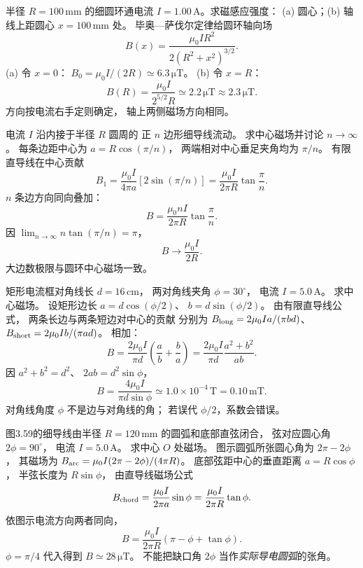 半径 $R=100\,\mathrm{mm}$ 的细圆环通电流
$I=1.00\,\mathrm A$。求磁感应强度：
(a) 圆心；(b) 轴线上距圆心
$x=100\,\mathrm{mm}$ 处。
\exsolution
毕奥—萨伐尔定律给圆环轴向场
\[
B(x)=\frac{\mu_0IR^2}{2(R^2+x^2)^{3/2}}.
\]
(a) 令 $x=0$：
$\boxed{B_0=\mu_0I/(2R)\simeq6.3\,\mathrm{\mu T}}$。
(b) 令 $x=R$：
\[
\boxed{B(R)=\frac{\mu_0I}{2^{5/2}R}
\simeq2.2\,\mathrm{\mu T}\approx2.3\,\mathrm{\mu T}}.
\]
\excheck 方向按电流右手定则确定，
轴上两侧磁场方向相同。

电流 $I$ 沿内接于半径 $R$ 圆周的
正 $n$ 边形细导线流动。
求中心磁场并讨论 $n\to\infty$。
\exsolution
每条边距中心为
$a=R\cos(\pi/n)$，
两端相对中心垂足夹角均为 $\pi/n$。
有限直导线在中心贡献
\[
B_1=\frac{\mu_0I}{4\pi a}
[2\sin(\pi/n)]
=\frac{\mu_0I}{2\pi R}\tan\frac\pi n.
\]
$n$ 条边方向同向叠加：
\[
\boxed{B=\frac{\mu_0 nI}{2\pi R}\tan\frac\pi n}.
\]
因 $\lim_{n\to\infty}n\tan(\pi/n)=\pi$，
\[
\boxed{B\longrightarrow\frac{\mu_0I}{2R}}.
\]
\excheck 大边数极限与圆环中心磁场一致。

矩形电流框对角线长
$d=16\,\mathrm{cm}$，
两对角线夹角 $\phi=30^\circ$，
电流 $I=5.0\,\mathrm A$。
求中心磁场。
\exsolution
设矩形边长
$a=d\cos(\phi/2)$、
$b=d\sin(\phi/2)$。
由有限直导线公式，
两条长边与两条短边对中心的贡献
分别为
$B_{\rm long}=2\mu_0I a/(\pi bd)$、
$B_{\rm short}=2\mu_0I b/(\pi ad)$。
相加：
\[
B=\frac{2\mu_0I}{\pi d}
\left(\frac ab+\frac ba\right)
=\frac{2\mu_0I}{\pi d}
\frac{a^2+b^2}{ab}.
\]
因 $a^2+b^2=d^2$、
$2ab=d^2\sin\phi$，
\[
\boxed{B=\frac{4\mu_0I}{\pi d\sin\phi}
\simeq1.0\times10^{-4}\,\mathrm T=0.10\,\mathrm{mT}}.
\]
\excheck 对角线角度 $\phi$ 不是边与对角线的角；
若误代 $\phi/2$，系数会错误。

图3.59的细导线由半径 $R=120\,\mathrm{mm}$
的圆弧和底部直弦闭合，
弦对应圆心角 $2\phi=90^\circ$，
电流 $I=5.0\,\mathrm A$。
求中心 $O$ 处磁场。
\exsolution
图示圆弧所张圆心角为
$2\pi-2\phi$，
其磁场为
$B_{\rm arc}=\mu_0I(2\pi-2\phi)/(4\pi R)$。
底部弦距中心的垂直距离
$a=R\cos\phi$，
半弦长度为 $R\sin\phi$，
由直导线磁场公式
\[
B_{\rm chord}=
\frac{\mu_0I}{2\pi a}\sin\phi
=\frac{\mu_0I}{2\pi R}\tan\phi.
\]
依图示电流方向两者同向，
\[
\boxed{B=\frac{\mu_0I}{2\pi R}
(\pi-\phi+\tan\phi)}.
\]
$\phi=\pi/4$ 代入得到
$\boxed{B\simeq28\,\mathrm{\mu T}}$。
\excheck 不能把缺口角 $2\phi$
当作\emph{实际导电圆弧}的张角。

